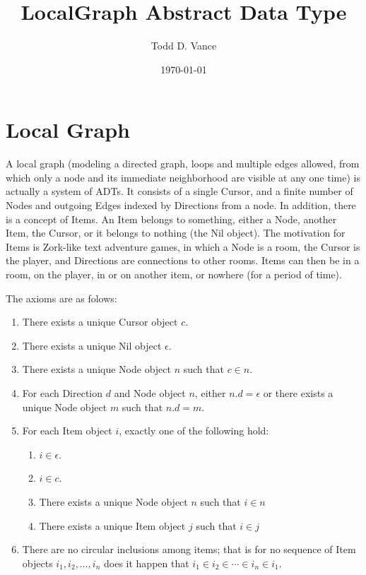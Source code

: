\documentclass{amsart}
\title{LocalGraph Abstract Data Type}
\author{Todd D. Vance}
\date{\today}
\begin{document}
\maketitle{}

\section{Local Graph}

A local graph (modeling a directed graph, loops and multiple edges allowed, from which only a node and its immediate neighborhood are visible at any one time) is actually a system of ADTs.  It consists of a single Cursor, and a finite number of Nodes and outgoing Edges indexed by Directions from a node.  In addition, there is a concept of Items. An Item belongs to something, either a Node, another Item, the Cursor, or it belongs to nothing (the Nil object). The motivation for Items is Zork-like text adventure games, in which a Node is a room, the Cursor is the player, and Directions are connections to other rooms.  Items can then be in a room, on the player, in or on another item, or nowhere (for a period of time).

The axioms are as folows:

\begin{enumerate}
\item There exists a unique Cursor object $c$.
\item There exists a unique Nil object $\epsilon$.
\item There exists a unique Node object $n$ such that $c\in{n}$.
\item For each Direction $d$ and Node object $n$, either $n.d=\epsilon$ or there exists a unique Node object $m$ such that $n.d=m$.
\item For each Item object $i$, exactly one of the following hold:
\begin{enumerate}
\item $i\in\epsilon$.
\item $i\in{c}$.
\item There exists a unique Node object $n$ such that $i\in{n}$
\item There exists a unique Item object $j$ such that $i\in{j}$
\end{enumerate}
\item There are no circular inclusions among items; that is for no sequence of Item objects $i_1, i_2, \dots, i_n$ does it happen that $i_1\in i_2 \in \cdots\in i_n\in i_1$.
\end{enumerate}
\end{document}

